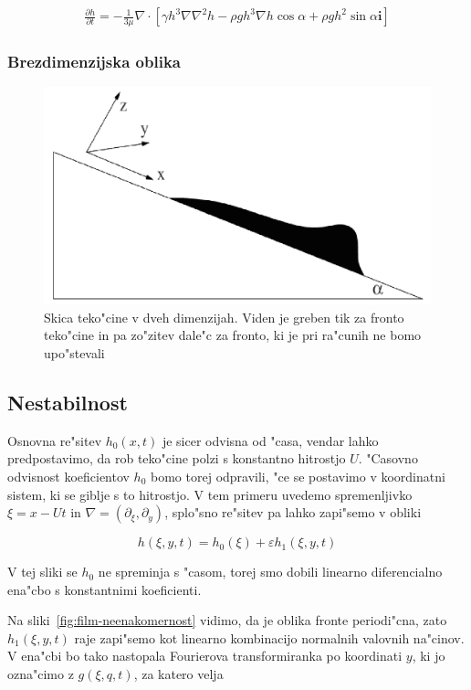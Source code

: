 \documentclass[a4paper,10pt]{article}
\renewcommand{\vec}{\mathbf}
\newcommand{\eps}{\varepsilon}
\begin{document}
\begin{align}
 \frac{\partial h}{\partial t} = -\frac{1}{3\mu}\nabla \cdot \left[ \gamma h^3 \nabla \nabla^2 h - \rho g h^3 \nabla h \cos \alpha + \rho g h^2 \sin \alpha \vec i \right]
\end{align}

\subsubsection{Brezdimenzijska oblika}

\begin{figure}[h]
\centering
 \includegraphics[width=.8\textwidth]{./Slike/film-skica}
\caption{Skica teko"cine v dveh dimenzijah. Viden je greben tik za fronto teko"cine in pa zo"zitev dale"c za fronto, ki je pri ra"cunih ne bomo upo"stevali}
\label{fig:film-skica}
\end{figure}

\subsection{Nestabilnost}

Osnovna re"sitev $h_0(x, t)$ je sicer odvisna od "casa, vendar lahko predpostavimo, da rob teko"cine polzi s konstantno hitrostjo $U$. "Casovno odvisnost koeficientov $h_0$ bomo torej odpravili, "ce se postavimo v koordinatni sistem, ki se giblje s to hitrostjo. V tem primeru uvedemo spremenljivko $\xi = x - Ut$ in $\nabla = (\partial_\xi, \partial_y)$, splo"sno re"sitev pa lahko zapi"semo v obliki

\begin{equation}
 h(\xi, y, t) = h_0(\xi) + \eps h_1(\xi, y, t)
\end{equation}

V tej sliki se $h_0$ ne spreminja s "casom, torej smo dobili linearno diferencialno ena"cbo s konstantnimi koeficienti. 

Na sliki~\ref{fig:film-neenakomernost} vidimo, da je oblika fronte periodi"cna, zato $h_1(\xi, y, t)$ raje zapi"semo kot linearno kombinacijo normalnih valovnih na"cinov. V ena"cbi bo tako nastopala Fourierova transformiranka po koordinati $y$, ki jo ozna"cimo z $g(\xi, q, t)$, za katero velja
\end{document}
